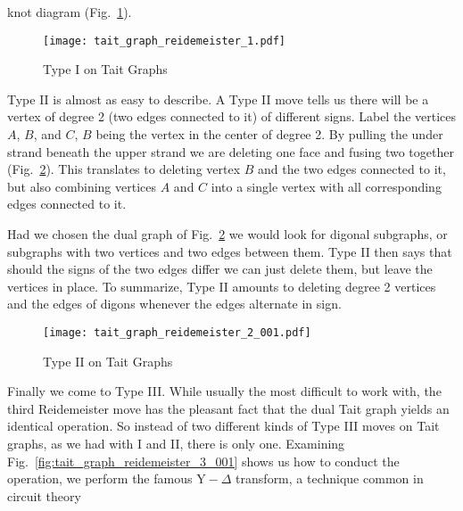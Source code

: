         knot diagram (Fig.~\ref{fig:tait_graph_reidemeister_1}).
        \begin{figure}
            \centering
            \texttt{[image: tait\_graph\_reidemeister\_1.pdf]}
            \caption{Type I on Tait Graphs}
            \label{fig:tait_graph_reidemeister_1}
        \end{figure}
        \par\hfill\par
        Type II is almost as easy to describe. A Type II move tells us there
        will be a vertex of degree 2 (two edges connected to it) of different
        signs. Label the vertices $A$, $B$, and $C$, $B$ being the vertex in
        the center of degree 2. By pulling the under strand beneath the upper
        strand we are deleting one face and fusing two together
        (Fig.~\ref{fig:tait_graph_reidemeister_2_001}). This translates to
        deleting vertex $B$ and the two edges connected to it, but also
        combining vertices $A$ and $C$ into a single vertex with all
        corresponding edges connected to it.
        \par\hfill\par
        Had we chosen the dual graph of
        Fig.~\ref{fig:tait_graph_reidemeister_2_001} we would look for digonal
        subgraphs, or subgraphs with two vertices and two edges between them.
        Type II then says that should the signs of the two edges differ we
        can just delete them, but leave the vertices in place. To summarize,
        Type II amounts to deleting degree 2 vertices and the edges of digons
        whenever the edges alternate in sign.
        \begin{figure}
            \centering
            \texttt{[image: tait\_graph\_reidemeister\_2\_001.pdf]}
            \caption{Type II on Tait Graphs}
            \label{fig:tait_graph_reidemeister_2_001}
        \end{figure}
        \par\hfill\par
        Finally we come to Type III. While usually the most difficult to work
        with, the third Reidemeister move has the pleasant fact that the dual
        Tait graph yields an identical operation. So instead of two different
        kinds of Type III moves on Tait graphs, as we had with I and II,
        there is only one. Examining
        Fig.~\ref{fig:tait_graph_reidemeister_3_001} shows us how to conduct
        the operation, we perform the famous
        $\textrm{Y}-\Delta$ transform, a technique common in circuit theory

